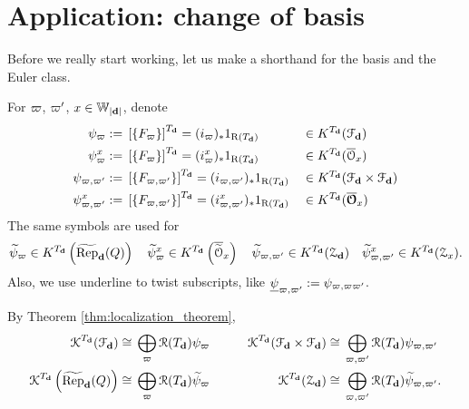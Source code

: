 \section{Application: change of basis}
Before we really start working, let us make a shorthand for the basis and the Euler class.

\begin{defn}
For $\varpi$, $\varpi'$, $x \in \mathbb{W}_{|\mathbf{d}|}$, denote
\begin{equation*}
\begin{aligned}
  \psi_{\varpi}:=\;& \left[\{F_{\varpi}\} \right]^{T_{\mathbf{d}}} = (i_{\varpi})_{*} 1_{\operatorname{\operatorname{R}}(T_{\mathbf{d}})} && \in K^{T_{\mathbf{d}}} (\mathcal{F}_{\mathbf{d}}) \\ 
  \psi_{\varpi}^{x}:=\;& \left[\{F_{\varpi}\} \right]^{T_{\mathbf{d}}} = (i_{\varpi}^x)_{*} 1_{\operatorname{\operatorname{R}}(T_{\mathbf{d}})} && \in K^{T_{\mathbf{d}}} (\overline{\mathcal{O}}_x) \\ 
  \psi_{\varpi,\varpi'}:=\;& \left[\{F_{\varpi,\varpi'}\} \right]^{T_{\mathbf{d}}} = (i_{\varpi,\varpi'})_{*} 1_{\operatorname{\operatorname{R}}(T_{\mathbf{d}})} && \in K^{T_{\mathbf{d}}} (\mathcal{F}_{\mathbf{d}} \times \mathcal{F}_{\mathbf{d}} ) \\ 
  \psi_{\varpi,\varpi'}^{x}:=\;& \left[\{F_{\varpi,\varpi'}\} \right]^{T_{\mathbf{d}}} = (i_{\varpi,\varpi'}^{x})_{*} 1_{\operatorname{\operatorname{R}}(T_{\mathbf{d}})} && \in K^{T_{\mathbf{d}}} (\overline{\boldsymbol{\mathcal{O}}}_x) \\ 
\end{aligned}
\end{equation*}
The same symbols are used for 
$$\widetilde{\psi}_{\varpi} \in K^{T_{\mathbf{d}}} \left( \operatorname{\widetilde{\operatorname{Rep}}}_{\mathbf{d}}(Q) \right)  \quad  \widetilde{\psi}_{\varpi}^{x} \in K^{T_{\mathbf{d}}} \left( \overline{\widetilde{\mathcal{O}}}_x \right)  \quad  \widetilde{\psi}_{\varpi,\varpi'} \in K^{T_{\mathbf{d}}} (\operatorname{\mathcal{Z}}_{\mathbf{d}})  \quad  \widetilde{\psi}_{\varpi,\varpi'}^{x} \in K^{T_{\mathbf{d}}} (\operatorname{\mathcal{Z}}_x).$$
Also, we use underline to twist subscripts, like $\underline{\psi}_{\varpi,\varpi'}:=\psi_{\varpi,\varpi\varpi'}$.
\end{defn}

By Theorem \ref{thm:localization_theorem},
\begin{equation*}
\begin{aligned}
   \operatorname{\operatorname{\mathcal{K}}}^{T_{\mathbf{d}}} (\mathcal{F}_{\mathbf{d}}) \cong\;& \bigoplus_{\varpi} \operatorname{\operatorname{\mathcal{R}}}(T_{\mathbf{d}}) \psi_{\varpi}\qquad & \operatorname{\operatorname{\mathcal{K}}}^{T_{\mathbf{d}}} (\mathcal{F}_{\mathbf{d}} \times \mathcal{F}_{\mathbf{d}} ) \cong\;& \bigoplus_{\varpi,\varpi'} \operatorname{\operatorname{\mathcal{R}}}(T_{\mathbf{d}}) \psi_{\varpi,\varpi'} \\ 
   \operatorname{\operatorname{\mathcal{K}}}^{T_{\mathbf{d}}} \left(\operatorname{\widetilde{\operatorname{Rep}}}_{\mathbf{d}}(Q)\right) \cong\;& \bigoplus_{\varpi} \operatorname{\operatorname{\mathcal{R}}}(T_{\mathbf{d}}) \widetilde{\psi}_{\varpi} & \operatorname{\operatorname{\mathcal{K}}}^{T_{\mathbf{d}}} (\operatorname{\mathcal{Z}}_{\mathbf{d}} ) \cong\;& \bigoplus_{\varpi,\varpi'} \operatorname{\operatorname{\mathcal{R}}}(T_{\mathbf{d}}) \widetilde{\psi}_{\varpi,\varpi'}. \\ 
\end{aligned}
\end{equation*}

